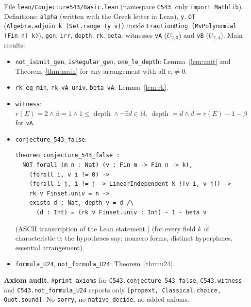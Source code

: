 \documentclass[11pt]{article}
\theoremstyle{definition}
\theoremstyle{remark}
\newcommand{\rk}{r}
\newcommand{\depth}{\operatorname{depth}}
\begin{document}
File \texttt{lean/Conjecture543/Basic.lean} (namespace \texttt{C543}, only \texttt{import Mathlib}).
Definitions: \texttt{alpha} (written with the Greek letter in Lean), \texttt{y}, \texttt{OT} (\texttt{Algebra.adjoin k (Set.range (y v))} inside
\texttt{FractionRing (MvPolynomial (Fin n) k)}), \texttt{gen}, \texttt{irr}, \texttt{depth},
\texttt{rk}, \texttt{beta}; witnesses \texttt{vA} ($U_{2,3}$) and \texttt{vB} ($U_{2,4}$).
Main results:
\begin{itemize}
\item \texttt{not\_isUnit\_gen}, \texttt{isRegular\_gen}, \texttt{one\_le\_depth}: Lemma~\ref{lem:unit}
  and Theorem~\ref{thm:main} for any arrangement with all $c_i\neq0$.
\item \texttt{rk\_eq\_min}, \texttt{rk\_vA\_univ}, \texttt{beta\_vA}: Lemma~\ref{lem:rk}.
\item \texttt{witness}: $\rk(E)=2\wedge\beta=1\wedge 1\le\depth\wedge\neg\exists d\in\mathbb{N},\
  \depth=d\wedge d=\rk(E)-1-\beta$ for \texttt{vA}.
\item \texttt{conjecture\_543\_false}:
{\small
\begin{verbatim}
theorem conjecture_543_false :
  NOT forall (m n : Nat) (v : Fin m -> Fin n -> k),
    (forall i, v i != 0) ->
    (forall i j, i != j -> LinearIndependent k ![v i, v j]) ->
    rk v Finset.univ = n ->
    exists d : Nat, depth v = d /\
      (d : Int) = (rk v Finset.univ : Int) - 1 - beta v
\end{verbatim}
}
(ASCII transcription of the Lean statement.)
  (for every field $k$ of characteristic $0$; the hypotheses say: nonzero forms, distinct
  hyperplanes, essential arrangement).
\item \texttt{formula\_U24}, \texttt{not\_formula\_U24}: Theorem~\ref{thm:u24}.
\end{itemize}
\textbf{Axiom audit.} \texttt{\#print axioms} for \texttt{C543.conjecture\_543\_false},
\texttt{C543.witness} and \texttt{C543.not\_formula\_U24} reports only
\texttt{[propext, Classical.choice, Quot.sound]}. No \texttt{sorry}, no \texttt{native\_decide},
no added axioms.
\end{document}
